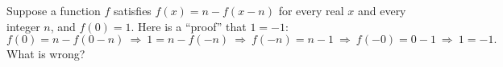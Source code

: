 Suppose a function $f$ satisfies $f(x)=n-f(x-n)$ for every real $x$ and every integer $n$, and $f(0)=1$. Here is a ``proof'' that $1=-1$:
\[
f(0)=n-f(0-n)\ \Rightarrow\ 1=n-f(-n)\ \Rightarrow\ f(-n)=n-1\ \Rightarrow\ f(-0)=0-1\ \Rightarrow\ 1=-1 .
\]
What is wrong?
